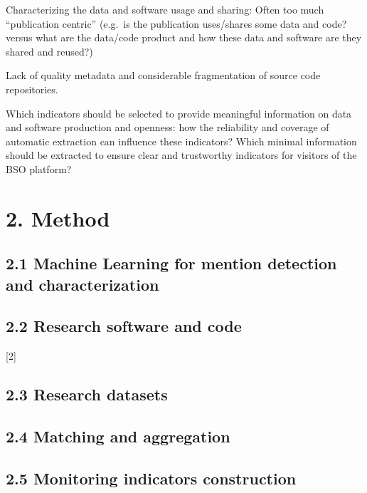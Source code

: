 \documentclass[
]{article}
\begin{document}
Characterizing the data and software usage and sharing: Often too much
``publication centric'' (e.g.~is the publication uses/shares some data
and code? versus what are the data/code product and how these data and
software are they shared and reused?)

Lack of quality metadata and considerable fragmentation of source code
repositories.

Which indicators should be selected to provide meaningful information on
data and software production and openness: how the reliability and
coverage of automatic extraction can influence these indicators? Which
minimal information should be extracted to ensure clear and trustworthy
indicators for visitors of the BSO platform?

\hypertarget{method}{%
\section{2. Method}\label{method}}

\hypertarget{machine-learning-for-mention-detection-and-characterization}{%
\subsection{2.1 Machine Learning for mention detection and
characterization}\label{machine-learning-for-mention-detection-and-characterization}}

\hypertarget{research-software-and-code}{%
\subsection{2.2 Research software and
code}\label{research-software-and-code}}

{[}2{]}

\hypertarget{research-datasets}{%
\subsection{2.3 Research datasets}\label{research-datasets}}

\hypertarget{matching-and-aggregation}{%
\subsection{2.4 Matching and
aggregation}\label{matching-and-aggregation}}

\hypertarget{monitoring-indicators-construction}{%
\subsection{2.5 Monitoring indicators
construction}\label{monitoring-indicators-construction}}
\end{document}
